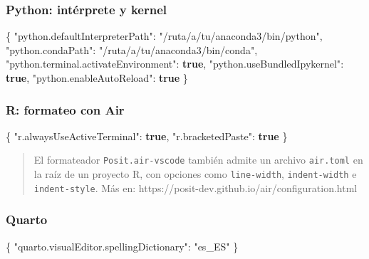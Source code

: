 \documentclass[
  doc,
  floatsintext,
  longtable,
  a4paper,
  nolmodern,
  notxfonts,
  notimes,
  12pt,
  colorlinks=true,linkcolor=blue,citecolor=blue,urlcolor=blue]{apa7}
\newenvironment{Shaded}{\begin{snugshade}}{\end{snugshade}}
\newcommand{\DataTypeTok}[1]{\textcolor[rgb]{0.68,0.00,0.00}{#1}}
\newcommand{\FunctionTok}[1]{\textcolor[rgb]{0.28,0.35,0.67}{#1}}
\newcommand{\KeywordTok}[1]{\textcolor[rgb]{0.00,0.23,0.31}{\textbf{#1}}}
\newcommand{\StringTok}[1]{\textcolor[rgb]{0.13,0.47,0.30}{#1}}
\begin{document}
\subsubsection{Python: intérprete y
kernel}\label{python-intuxe9rprete-y-kernel}

\begin{Shaded}
\begin{Highlighting}[]
\FunctionTok{\{}
  \DataTypeTok{"python.defaultInterpreterPath"}\FunctionTok{:} \StringTok{"/ruta/a/tu/anaconda3/bin/python"}\FunctionTok{,}
  \DataTypeTok{"python.condaPath"}\FunctionTok{:} \StringTok{"/ruta/a/tu/anaconda3/bin/conda"}\FunctionTok{,}
  \DataTypeTok{"python.terminal.activateEnvironment"}\FunctionTok{:} \KeywordTok{true}\FunctionTok{,}
  \DataTypeTok{"python.useBundledIpykernel"}\FunctionTok{:} \KeywordTok{true}\FunctionTok{,}
  \DataTypeTok{"python.enableAutoReload"}\FunctionTok{:} \KeywordTok{true}
\FunctionTok{\}}
\end{Highlighting}
\end{Shaded}

\subsubsection{R: formateo con Air}\label{r-formateo-con-air}

\begin{Shaded}
\begin{Highlighting}[]
\FunctionTok{\{}
  \DataTypeTok{"r.alwaysUseActiveTerminal"}\FunctionTok{:} \KeywordTok{true}\FunctionTok{,}
  \DataTypeTok{"r.bracketedPaste"}\FunctionTok{:} \KeywordTok{true}
\FunctionTok{\}}
\end{Highlighting}
\end{Shaded}

\begin{quote}
El formateador \texttt{Posit.air-vscode} también admite un archivo
\texttt{air.toml} en la raíz de un proyecto R, con opciones como
\texttt{line-width}, \texttt{indent-width} e \texttt{indent-style}. Más
en: https://posit-dev.github.io/air/configuration.html
\end{quote}

\subsubsection{Quarto}\label{quarto}

\begin{Shaded}
\begin{Highlighting}[]
\FunctionTok{\{}
  \DataTypeTok{"quarto.visualEditor.spellingDictionary"}\FunctionTok{:} \StringTok{"es\_ES"}
\FunctionTok{\}}
\end{Highlighting}
\end{Shaded}
\end{document}
